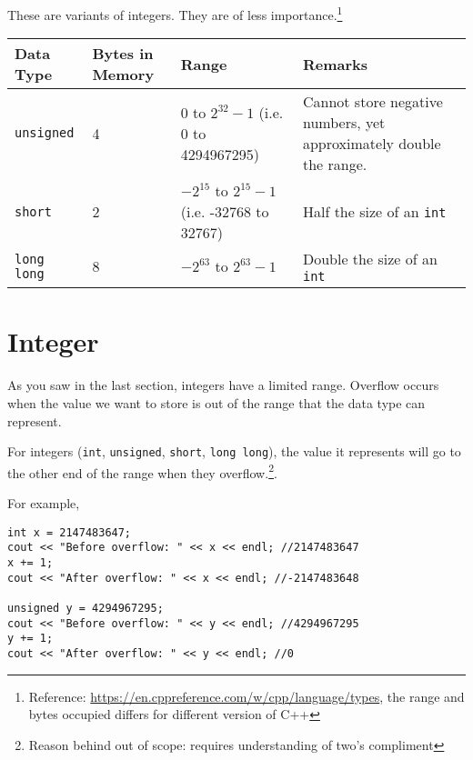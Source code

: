 \pagebreak

These are variants of integers. They are of less importance.\footnote{Reference: \href{https://en.cppreference.com/w/cpp/language/types}{https://en.cppreference.com/w/cpp/language/types}, the range and bytes occupied differs for different version of C++}

\begin{table}[h]
    \centering
    \begin{tabular}{|m{6em}|m{6em}|m{10em}|m{12em}|}
        \hline
        \textbf{Data Type} & 
        Bytes in Memory & 
        Range & 
        Remarks 
        \\ \hline \hline
        
        \texttt{unsigned} &
        4 & 
        $0$ to $2^{32}-1$ (i.e. 0 to 4294967295) &
        Cannot store negative numbers, yet approximately double the range.
        \\ \hline
        
        \texttt{short} &
        2 & 
        $-2^{15}$ to $2^{15}-1$ (i.e. -32768 to 32767) &
        Half the size of an \texttt{int}
        \\ \hline
        
        \texttt{long long} &
        8 & 
        $-2^{63}$ to $2^{63}-1$ &
        Double the size of an \texttt{int}
        \\ \hline
        
    \end{tabular}
\end{table}

\section{Integer }

As you saw in the last section, integers have a limited range. Overflow occurs when the value we want to store is out of the range that the data type can represent. 

For integers (\texttt{int}, \texttt{unsigned}, \texttt{short}, \texttt{long long}), the value it represents will go to the other end of the range when they overflow.\footnote{Reason behind out of scope: requires understanding of two's compliment}. 

For example,
\begin{lstlisting}
int x = 2147483647;
cout << "Before overflow: " << x << endl; //2147483647
x += 1;
cout << "After overflow: " << x << endl; //-2147483648

unsigned y = 4294967295;
cout << "Before overflow: " << y << endl; //4294967295
y += 1;
cout << "After overflow: " << y << endl; //0
\end{lstlisting}

